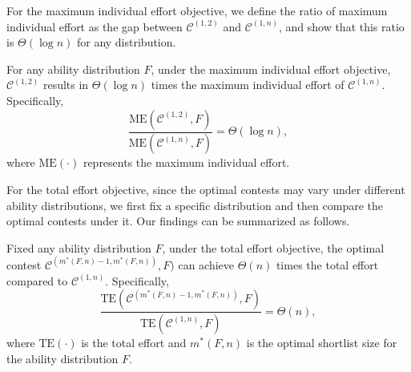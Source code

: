 For the maximum individual effort objective, we define the ratio of maximum individual effort as the gap between $\mathcal{C}^{(1,2)}$ and $\mathcal{C}^{(1,n)}$, and show that this ratio is $\Theta(\log n)$ for any distribution.

\begin{theorem}
    For any ability distribution $F$, under the maximum individual effort objective, $\mathcal{C}^{(1,2)}$ results in $\Theta(\log n)$ times the maximum individual effort of $\mathcal{C}^{(1,n)}$. Specifically,  
    $$
        \frac{\text{ME}(\mathcal{C}^{(1,2)},F)}{\text{ME}(\mathcal{C}^{(1,n)},F)}
        = \Theta(\log n),
    $$
    where $\text{ME}(\cdot)$ represents the maximum individual effort.
\end{theorem}


For the total effort objective, since the optimal contests may vary under different ability distributions, we first fix a specific distribution and then compare the optimal contests under it. Our findings can be summarized as follows.

\begin{theorem}
    Fixed any ability distribution $F$, under the total effort objective, the optimal contest $\mathcal{C}^{(m^*(F,n)-1, m^*(F,n))},F)$ can achieve $\Theta(n)$ times the total effort compared to $\mathcal{C}^{(1,n)}$. Specifically,
    $$
        \frac{\text{TE}(\mathcal{C}^{(m^*(F,n)-1, m^*(F,n))},F)}{\text{TE}(\mathcal{C}^{(1,n)},F)}
         = \Theta(n),
    $$
    where $\text{TE}(\cdot)$ is the total effort and  $m^*(F,n)$ is the optimal shortlist size for the ability distribution $F$. 
\end{theorem}




